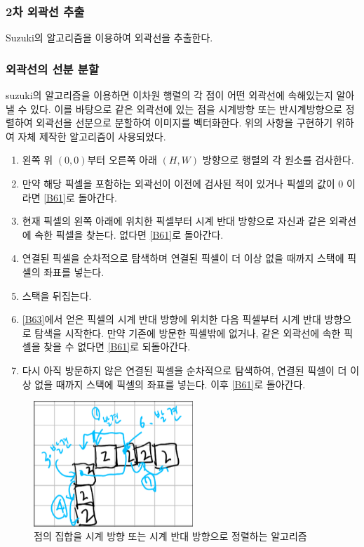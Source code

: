 \documentclass[conference]{IEEEtran}
\begin{document}
\subsubsection{2차 외곽선 추출}
Suzuki의 알고리즘\cite{suzuki}을 이용하여 외곽선을 추출한다.

\subsubsection{외곽선의 선분 분할}
suzuki의 알고리즘을 이용하면 이차원 행렬의 각 점이 어떤 외곽선에 속해있는지 알아낼 수 있다.
이를 바탕으로 같은 외곽선에 있는 점을 시계방향 또는 반시계방향으로 정렬하여 외곽선을 선분으로 분할하여 이미지를 벡터화한다.
위의 사항을 구현하기 위하여 자체 제작한 알고리즘이 사용되었다. 
\begin{enumerate}
    \item 왼쪽 위 $(0, 0)$부터 오른쪽 아래 $(H, W)$ 방향으로 행렬의 각 원소를 검사한다. \label{B61}
    \item 만약 해당 픽셀을 포함하는 외곽선이 이전에 검사된 적이 있거나 픽셀의 값이 0 이라면 \ref{B61}로 돌아간다.
    \item 현재 픽셀의 왼쪽 아래에 위치한 픽셀부터 시계 반대 방향으로 자신과 같은 외곽선에 속한 픽셀을 찾는다. 없다면 \ref{B61}로 돌아간다. \label{B63}
    \item 연결된 픽셀을 순차적으로 탐색하며 연결된 픽셀이 더 이상 없을 때까지 스택에 픽셀의 좌표를 넣는다.
    \item 스택을 뒤집는다.
    \item \ref{B63}에서 얻은 픽셀의 시계 반대 방향에 위치한 다음 픽셀부터 시계 반대 방향으로 탐색을 시작한다.
    만약 기존에 방문한 픽셀밖에 없거나, 같은 외곽선에 속한 픽셀을 찾을 수 없다면 \ref{B61}로 되돌아간다.
    \item 다시 아직 방문하지 않은 연결된 픽셀을 순차적으로 탐색하여, 연결된 픽셀이 더 이상 없을 때까지 스택에 픽셀의 좌표를 넣는다. 이후 \ref{B61}로 돌아간다.
\end{enumerate}
\begin{figure}
    \centering
    \includegraphics[width=6cm]{algo.png}
    \caption{점의 집합을 시계 방향 또는 시계 반대 방향으로 정렬하는 알고리즘}
\end{figure}
\end{document}
